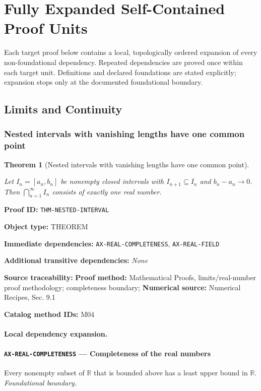 \documentclass[10pt]{article}
\newcommand{\pidraw}[1]{\begingroup\urlstyle{tt}\nolinkurl{#1}\endgroup}
\newtheorem{theorem}{Theorem}[section]
\theoremstyle{definition}
\theoremstyle{remark}
\newcommand{\meta}[2]{\noindent\textbf{#1:} #2\par}
\begin{document}
\section{Fully Expanded Self-Contained Proof Units}

Each target proof below contains a local, topologically ordered expansion of every non-foundational dependency. Repeated dependencies are proved once within each target unit. Definitions and declared foundations are stated explicitly; expansion stops only at the documented foundational boundary.

\subsection{Limits and Continuity}

\subsubsection{Nested intervals with vanishing lengths have one common point}

\begin{theorem}[Nested intervals with vanishing lengths have one common point]\label{prf:THM-NESTED-INTERVAL}

Let $I_n=[a_n,b_n]$ be nonempty closed intervals with
$I_{n+1}\subseteq I_n$ and $b_n-a_n\to0$. Then
$\bigcap_{n=1}^\infty I_n$ consists of exactly one real number.

\end{theorem}

\meta{Proof ID}{\pidraw{THM-NESTED-INTERVAL}}
\meta{Object type}{THEOREM}
\meta{Immediate dependencies}{\pidraw{AX-REAL-COMPLETENESS}, \pidraw{AX-REAL-FIELD}}
\meta{Additional transitive dependencies}{\emph{None}}
\meta{Source traceability}{\textbf{Proof method:} Mathematical Proofs, limits/real-number proof methodology; completeness boundary; \textbf{Numerical source:} Numerical Recipes, Sec. 9.1}
\meta{Catalog method IDs}{M04}

\paragraph{Local dependency expansion.}

\paragraph{\pidraw{AX-REAL-COMPLETENESS} --- Completeness of the real numbers}
Every nonempty subset of $\mathbb{R}$ that is bounded above has a least upper bound in $\mathbb{R}$.
\textit{Foundational boundary.}
\end{document}
